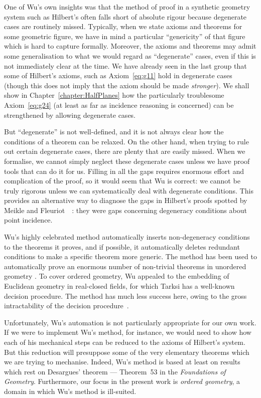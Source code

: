 One of Wu's own insights was that the method of proof in a synthetic geometry system such as Hilbert's often falls short of absolute rigour because degenerate cases are routinely missed. Typically, when we state axioms and theorems for some geometric figure, we have in mind a particular ``genericity'' of that figure which is hard to capture formally. Moreover, the axioms and theorems may admit some generalisation to what we would regard as ``degenerate'' cases, even if this is not immediately clear at the time. We have already seen in the last group that some of Hilbert's axioms, such as Axiom~\ref{eq:g11} hold in degenerate cases (though this does not imply that the axiom should be made \emph{stronger}). We shall show in Chapter~\ref{chapter:HalfPlanes} how the particularly troublesome Axiom~\ref{eq:g24} (at least as far as incidence reasoning is concerned) can be strengthened by allowing degenerate cases.

But ``degenerate'' is not well-defined, and it is not always clear how the conditions of a theorem can be relaxed. On the other hand, when trying to rule out certain degenerate cases, there are plenty that are easily missed. When we formalise, we cannot simply neglect these degenerate cases unless we have proof tools that can do it for us. Filling in all the gaps requires enormous effort and complication of the proof, so it would seem that Wu is correct: we cannot be truly rigorous unless we can systematically deal with degenerate conditions. This provides an alternative way to diagnose the gaps in Hilbert's proofs spotted by Meikle and Fleuriot~~\cite{MeikleFleuriotFormalizingHilbert}: they were gaps concerning degeneracy conditions about point incidence.

Wu's highly celebrated method automatically inserts non-degeneracy conditions to the theorems it proves, and if possible, it automatically deletes redundant conditions to make a specific theorem more generic. The method has been used to automatically prove an enormous number of non-trivial theorems in unordered geometry \cite{MechanicalGeometryTheoremProving}. To cover ordered geometry, Wu appealed to the embedding of Euclidean geometry in real-closed fields, for which Tarksi has a well-known decision procedure. The method has much less success here, owing to the gross intractability of the decision procedure~\cite{TarksiMcNaugtonReview}. 

Unfortunately, Wu's automation is not particularly appropriate for our own work. If we were to implement Wu's method, for instance, we would need to show how each of his mechanical steps can be reduced to the axioms of Hilbert's system. But this reduction will presuppose some of the very elementary theorems which we are trying to mechanise. Indeed, Wu's method is based at least on results which rest on Desargues' theorem --- Theorem~53 in the \emph{Foundations of Geometry}. Furthermore, our focus in the present work is \emph{ordered geometry}, a domain in which Wu's method is ill-suited. 

